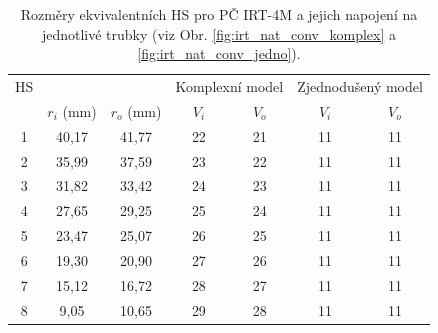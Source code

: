 \begin{table}[H]
	\centering
	\caption{Rozměry ekvivalentních HS pro PČ IRT-4M a jejich napojení na jednotlivé trubky (viz Obr. \ref{fig:irt_nat_conv_komplex} a \ref{fig:irt_nat_conv_jedno}). }
	\label{tab:equivalent_hs}
	\begin{tabular}{ccccccc}
		\hline
		HS &  &  & \multicolumn{2}{c}{Komplexní model} & \multicolumn{2}{c}{Zjednodušený model} \\
		 & $ r_i $ (mm)& $ r_o $ (mm) & $V_i$ & $V_o$ & $V_i$ & $V_o$ \\
		 \hline
		 \hline
		
		1 & 40,17 & 41,77 & 22 & 21 & 11 & 11 \\
		2 & 35,99 & 37,59 & 23 & 22 & 11 & 11 \\
		3 & 31,82 & 33,42 & 24 & 23 & 11 & 11 \\
		4 & 27,65 & 29,25 & 25 & 24 & 11 & 11 \\
		5 & 23,47 & 25,07 & 26 & 25 & 11 & 11 \\
		6 & 19,30 & 20,90 & 27 & 26 & 11 & 11 \\
		7 & 15,12 & 16,72 & 28 & 27 & 11 & 11 \\
		8 & 9,05  & 10,65 & 29 & 28 & 11 & 11  \\
		
		\hline
	\end{tabular}
\end{table}

